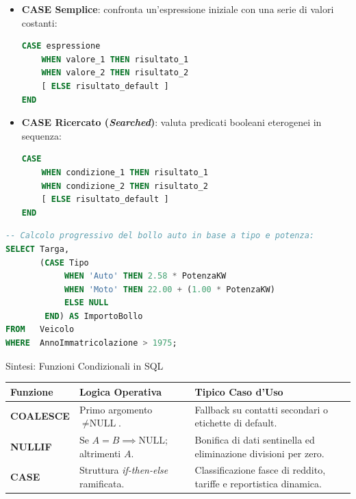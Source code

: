 \documentclass[12pt]{extarticle}
\begin{document}
\begin{itemize}
    \item \textbf{CASE Semplice}: confronta un'espressione iniziale con una serie di valori costanti:
\begin{lstlisting}[language=SQL]
CASE espressione
    WHEN valore_1 THEN risultato_1
    WHEN valore_2 THEN risultato_2
    [ ELSE risultato_default ]
END
\end{lstlisting}
    \item \textbf{CASE Ricercato (\textit{Searched})}: valuta predicati booleani eterogenei in sequenza:
\begin{lstlisting}[language=SQL]
CASE
    WHEN condizione_1 THEN risultato_1
    WHEN condizione_2 THEN risultato_2
    [ ELSE risultato_default ]
END
\end{lstlisting}
\end{itemize}

\begin{lstlisting}[language=SQL, caption={Calcolo dell'imposta sui veicoli con CASE}]
-- Calcolo progressivo del bollo auto in base a tipo e potenza:
SELECT Targa,
       (CASE Tipo
            WHEN 'Auto' THEN 2.58 * PotenzaKW
            WHEN 'Moto' THEN 22.00 + (1.00 * PotenzaKW)
            ELSE NULL
        END) AS ImportoBollo
FROM   Veicolo
WHERE  AnnoImmatricolazione > 1975;
\end{lstlisting}

\begin{cbox}{Sintesi: Funzioni Condizionali in SQL}
\begin{center}
\small
\begin{tabular}{lp{5.4cm}p{6.4cm}}
    \toprule
    \textbf{Funzione} & \textbf{Logica Operativa} & \textbf{Tipico Caso d'Uso} \\
    \midrule
    \textbf{COALESCE} & Primo argomento $\neq \text{NULL}$. & Fallback su contatti secondari o etichette di default. \\
    \addlinespace
    \textbf{NULLIF} & Se $A = B \implies \text{NULL}$; altrimenti $A$. & Bonifica di dati sentinella ed eliminazione divisioni per zero. \\
    \addlinespace
    \textbf{CASE} & Struttura \textit{if-then-else} ramificata. & Classificazione fasce di reddito, tariffe e reportistica dinamica. \\
    \bottomrule
\end{tabular}
\end{center}
\end{cbox}
\end{document}
